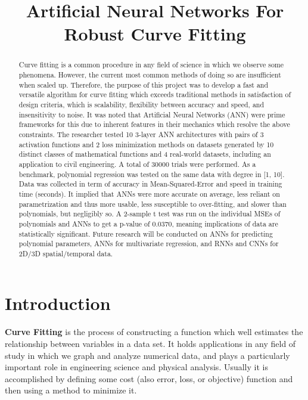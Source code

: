 \documentclass{article}
\title{\textbf{Artificial Neural Networks For Robust Curve Fitting}}
\author{
}
\begin{document}
\maketitle
\begin{abstract} \normalsize

Curve fitting is a common procedure in any field of science in which we observe some phenomena. However, the current most common methods of doing so are insufficient when scaled up. Therefore, the purpose of this project was to develop a fast and versatile algorithm for curve fitting which exceeds traditional methods in satisfaction of design criteria, which is scalability, flexibility between accuracy and speed, and insensitivity to noise. It was noted that Artificial Neural Networks (ANN) were prime frameworks for this due to inherent features in their mechanics which resolve the above constraints. The researcher tested 10 3-layer ANN architectures with pairs of 3 activation functions and 2 loss minimization methods on datasets generated by 10 distinct classes of mathematical functions and 4 real-world datasets, including an application to civil engineering. A total of 30000 trials were performed. As a benchmark, polynomial regression was tested on the same data with degree in [1, 10]. Data was collected in term of accuracy in Mean-Squared-Error and speed in training time (seconds). It implied that ANNs were more accurate on average, less reliant on parametrization and thus more usable, less susceptible to over-fitting, and slower than polynomials, but negligibly so. A 2-sample t test was run on the individual MSEs of polynomials and ANNs to get a p-value of 0.0370, meaning implications of data are statistically significant. Future research will be conducted on ANNs for predicting polynomial parameters, ANNs for multivariate regression, and RNNs and CNNs for 2D/3D spatial/temporal data.

\end{abstract}



\vfill

\section{Introduction}
\textbf{Curve Fitting} is the process of constructing a function which well estimates the relationship
between variables in a data set. It holds applications in any field of study in which we graph and analyze 
numerical data, and plays a particularly important role in engineering science and physical analysis. 
Usually it is accomplished by defining some cost (also error, loss, or objective) function and then using a
method to minimize it.
\end{document}
